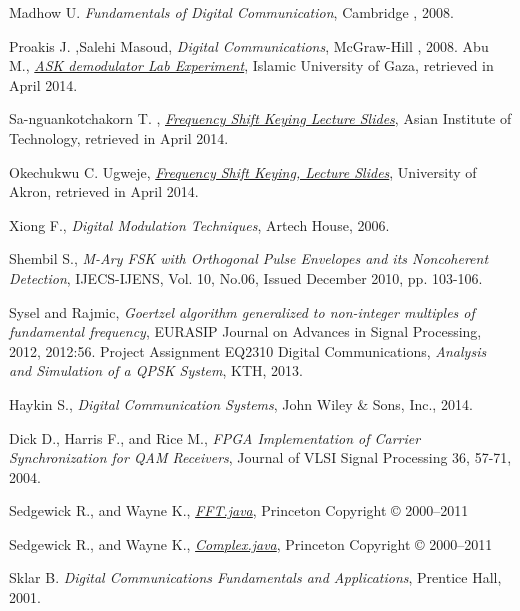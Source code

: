 \documentclass[12pt,a4paper,openright]{article}
\begin{document}
\begin{thebibliography}{1}
Madhow U. \emph{Fundamentals of Digital Communication}, Cambridge , 2008.


Proakis J. ,Salehi Masoud, \emph{Digital Communications}, McGraw-Hill , 2008.
Abu M., \href{http://site.iugaza.edu.ps/mabufoul/files/2010/09/Experiment-5.pdf}
{\emph{ASK demodulator Lab Experiment}},
Islamic University of Gaza, retrieved in April 2014.


Sa-nguankotchakorn T. , \href{http://www.tc.ait.ac.th/faculty/teerapat/AT77.11_Digital\%20Modulation\%20Techniques/III.Frequency_Shift_Keying.pdf}{\emph{Frequency Shift Keying Lecture Slides}}, Asian Institute of Technology, retrieved in April 2014.


Okechukwu C. Ugweje, \href{ugweje/web/Courses/Ee549/Handout/EE549F01Lecture37.pdf}{\emph{Frequency Shift Keying, Lecture Slides}},  University of Akron, retrieved in April 2014.



Xiong F., \emph{Digital Modulation Techniques}, Artech House, 2006.


Shembil S., \emph{M-Ary FSK with Orthogonal Pulse Envelopes and its Noncoherent Detection}, IJECS-IJENS, Vol. 10, No.06, Issued December 2010, pp. 103-106.

Sysel and Rajmic, \emph{Goertzel algorithm generalized to non-integer multiples of fundamental frequency}, EURASIP Journal on Advances in Signal Processing, 2012, 2012:56.
Project Assignment EQ2310 Digital Communications, \emph{Analysis and Simulation of a QPSK System}, KTH, 2013.

Haykin S., \emph{Digital Communication Systems}, John Wiley \& Sons, Inc., 2014.

Dick D., Harris F., and Rice M., \emph{FPGA Implementation of Carrier Synchronization for QAM Receivers}, Journal of VLSI Signal Processing 36, 57-71, 2004.

Sedgewick R., and Wayne K.,
\href{http://introcs.cs.princeton.edu/java/97data/FFT.java.html}{\emph{FFT.java}},  Princeton
Copyright © 2000–2011

Sedgewick R., and Wayne K.,
\href{http://introcs.cs.princeton.edu/java/97data/Complex.java.html}{\emph{Complex.java}},  Princeton
Copyright © 2000–2011


Sklar B. \emph{Digital Communications Fundamentals and Applications}, Prentice Hall, 2001.





\end{thebibliography}
\end{document}
